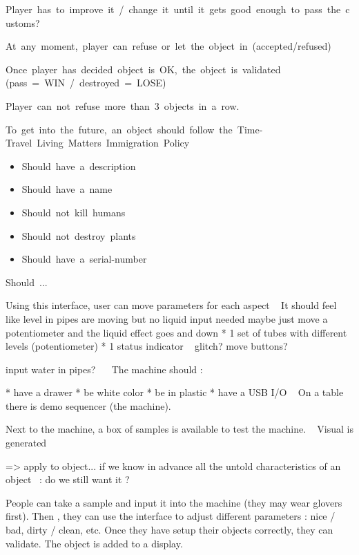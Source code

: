Player~has~to~improve~it~/~change~it~until~it~gets~good~enough~to~pass~the~customs?

At~any~moment,~player~can~refuse~or~let~the~object~in~(accepted/refused)

Once~player~has~decided~object~is~OK,~the~object~is~validated~\newline
(pass~=~WIN~/~destroyed~=~LOSE)


Player~can~not~refuse~more~than~3~objects~in~a~row.

To~get~into~the~future,~an~object~should~follow~the~Time-Travel~Living~Matters~Immigration~Policy~

\liststyleLix
\begin{itemize}
\item Should~have~a~description 
\item Should~have~a~name 
\item Should~not~kill~humans 
\item Should~not~destroy~plants 
\item Should~have~a~serial-number 
\end{itemize}
Should~...



\bigskip


\bigskip


\bigskip

Using this interface, user can move parameters for each aspect
~
It should feel like level in pipes are moving but no liquid input needed
maybe just move a potentiometer and the liquid effect goes and down
* 1 set of tubes with different levels (potentiometer)
* 1 status indicator
~
glitch?
move buttons?

input water in pipes?~
~
The machine should :

* have a drawer
* be white color
* be in plastic
* have a USB I/O
~
On a table there is demo sequencer (the machine).

Next to the machine, a box of samples is available to test the machine.
~
Visual is generated
~

={\textgreater} apply to object... if we know in advance all the untold
characteristics of an object~ : do we still want it ?
~

People can take a sample and input it into the machine (they may wear
glovers first).
Then , they can use the interface to adjust different parameters : nice
/ bad, dirty / clean, etc.
Once they have setup their objects correctly, they can validate.
The object is added to a display.

